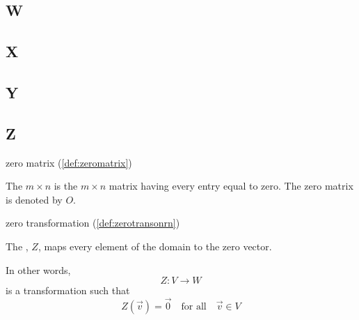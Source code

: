 \documentclass{ximera}
\begin{document}
\subsection{W}

\subsection{X}

\subsection{Y}

\subsection{Z}

zero matrix (\ref{def:zeromatrix})
\begin{expandable}
    The $m\times n$  is the $m\times n$ matrix
having every entry equal to zero. The zero matrix is
denoted by $O$.
\end{expandable}

zero transformation (\ref{def:zerotransonrn})
\begin{expandable}
    The , $Z$, maps every element of the domain to the zero vector.

In other words,
$$Z:V\rightarrow W$$ is a transformation such that $$Z(\vec{v})=\vec{0}\quad\text{for all}\quad \vec{v} \in V$$
\end{expandable}
\end{document}
